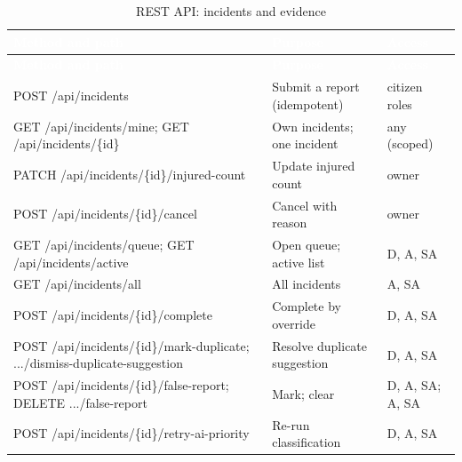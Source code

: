 {\tabfont\rowband
\begin{longtable}{@{}>{\raggedright\arraybackslash}p{}>{\raggedright\arraybackslash}p{}>{\raggedright\arraybackslash}p{}@{}}
\caption{REST API: incidents and evidence}\label{tab:api-3}\\
\rowcolor{najdanavy}\textcolor{white}{\sffamily\bfseries\small Method and path} & \textcolor{white}{\sffamily\bfseries\small Purpose} & \textcolor{white}{\sffamily\bfseries\small Access}\\
\endfirsthead
\rowcolor{najdanavy}\textcolor{white}{\sffamily\bfseries\small Method and path} & \textcolor{white}{\sffamily\bfseries\small Purpose} & \textcolor{white}{\sffamily\bfseries\small Access}\\
\endhead
\bottomrule\endlastfoot
POST /\allowbreak{}api/\allowbreak{}incidents & Submit a report (idempotent) & citizen roles\\
GET /\allowbreak{}api/\allowbreak{}incidents/\allowbreak{}mine; GET /\allowbreak{}api/\allowbreak{}incidents/\allowbreak{}\{id\} & Own incidents; one incident & any (scoped)\\
PATCH /\allowbreak{}api/\allowbreak{}incidents/\allowbreak{}\{id\}/\allowbreak{}injured-count & Update injured count & owner\\
POST /\allowbreak{}api/\allowbreak{}incidents/\allowbreak{}\{id\}/\allowbreak{}cancel & Cancel with reason & owner\\
GET /\allowbreak{}api/\allowbreak{}incidents/\allowbreak{}queue; GET /\allowbreak{}api/\allowbreak{}incidents/\allowbreak{}active & Open queue; active list & D, A, SA\\
GET /\allowbreak{}api/\allowbreak{}incidents/\allowbreak{}all & All incidents & A, SA\\
POST /\allowbreak{}api/\allowbreak{}incidents/\allowbreak{}\{id\}/\allowbreak{}complete & Complete by override & D, A, SA\\
POST /\allowbreak{}api/\allowbreak{}incidents/\allowbreak{}\{id\}/\allowbreak{}mark-duplicate; .../\allowbreak{}dismiss-duplicate-suggestion & Resolve duplicate suggestion & D, A, SA\\
POST /\allowbreak{}api/\allowbreak{}incidents/\allowbreak{}\{id\}/\allowbreak{}false-report; DELETE .../\allowbreak{}false-report & Mark; clear & D, A, SA; A, SA\\
POST /\allowbreak{}api/\allowbreak{}incidents/\allowbreak{}\{id\}/\allowbreak{}retry-ai-priority & Re-run classification & D, A, SA\\

\end{longtable}}
